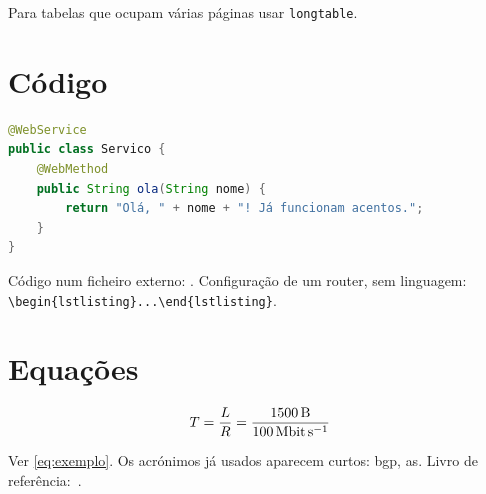 Para tabelas que ocupam várias páginas usar \texttt{longtable}.

\section{Código}

\begin{lstlisting}[language=Java, caption={Exemplo de Web Service}, label={lst:exemplo}]
@WebService
public class Servico {
    @WebMethod
    public String ola(String nome) {
        return "Olá, " + nome + "! Já funcionam acentos.";
    }
}
\end{lstlisting}

Código num ficheiro externo:
\verb||.
Configuração de um router, sem linguagem: \verb|\begin{lstlisting}...\end{lstlisting}|.

\section{Equações}

\begin{equation}
  \label{eq:exemplo}
  T = \frac{L}{R} = \frac{\SI{1500}{\byte}}{\SI{100}{\mega\bit\per\second}}
\end{equation}

Ver \cref{eq:exemplo}. Os acrónimos já usados aparecem curtos: \gls{bgp}, \gls{as}.
Livro de referência:~\cite{kurose2021}.
